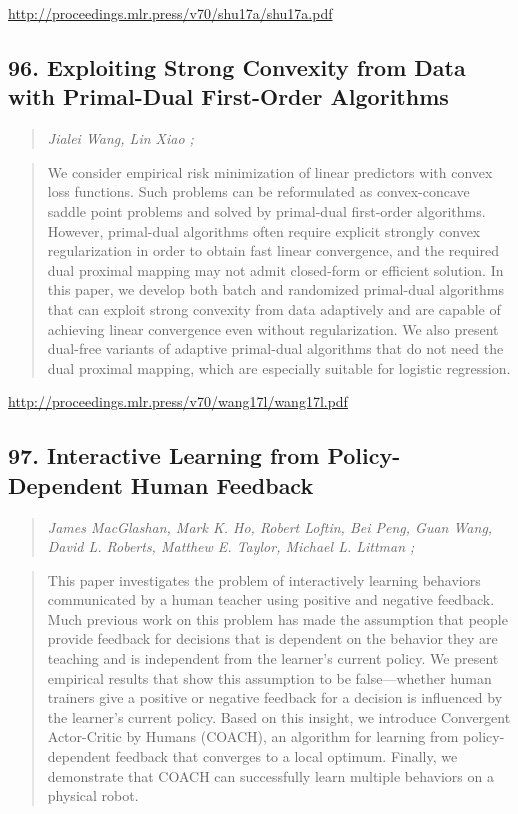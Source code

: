 \documentclass{article}
\begin{document}
\href{http://proceedings.mlr.press/v70/shu17a/shu17a.pdf}{http://proceedings.mlr.press/v70/shu17a/shu17a.pdf}

\subsection{96. Exploiting Strong Convexity from Data with Primal-Dual First-Order Algorithms}

\begin{quote}
\footnotesize{\textit{Jialei Wang, Lin Xiao ;}}

\end{quote}

\begin{quote}
    We consider empirical risk minimization of linear predictors with convex loss functions. Such problems can be reformulated as convex-concave saddle point problems and solved by primal-dual first-order algorithms. However, primal-dual algorithms often require explicit strongly convex regularization in order to obtain fast linear convergence, and the required dual proximal mapping may not admit closed-form or efficient solution. In this paper, we develop both batch and randomized primal-dual algorithms that can exploit strong convexity from data adaptively and are capable of achieving linear convergence even without regularization. We also present dual-free variants of adaptive primal-dual algorithms that do not need the dual proximal mapping, which are especially suitable for logistic regression.  
\end{quote}

\href{http://proceedings.mlr.press/v70/wang17l/wang17l.pdf}{http://proceedings.mlr.press/v70/wang17l/wang17l.pdf}

\subsection{97. Interactive Learning from Policy-Dependent Human Feedback}

\begin{quote}
\footnotesize{\textit{James MacGlashan, Mark K. Ho, Robert Loftin, Bei Peng, Guan Wang, David L. Roberts, Matthew E. Taylor, Michael L. Littman ;}}

\end{quote}

\begin{quote}
    This paper investigates the problem of interactively learning behaviors communicated by a human teacher using positive and negative feedback. Much previous work on this problem has made the assumption that people provide feedback for decisions that is dependent on the behavior they are teaching and is independent from the learner’s current policy. We present empirical results that show this assumption to be false—whether human trainers give a positive or negative feedback for a decision is influenced by the learner’s current policy. Based on this insight, we introduce Convergent Actor-Critic by Humans (COACH), an algorithm for learning from policy-dependent feedback that converges to a local optimum. Finally, we demonstrate that COACH can successfully learn multiple behaviors on a physical robot.  
\end{quote}
\end{document}
